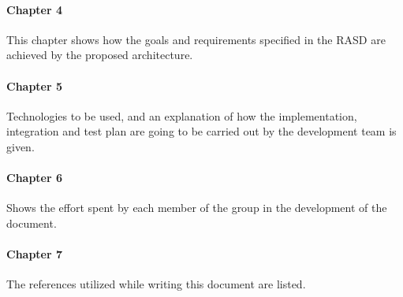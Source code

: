 \paragraph{Chapter 4} This chapter shows how the goals and requirements specified in the RASD are achieved by the proposed architecture.

\paragraph{Chapter 5} Technologies to be used, and an explanation of how the implementation, integration and test plan are going to be carried out by the development team is given.

\paragraph{Chapter 6} Shows the effort spent by each member of the group in the development of the document.

\paragraph{Chapter 7} The references utilized while writing this document are listed.